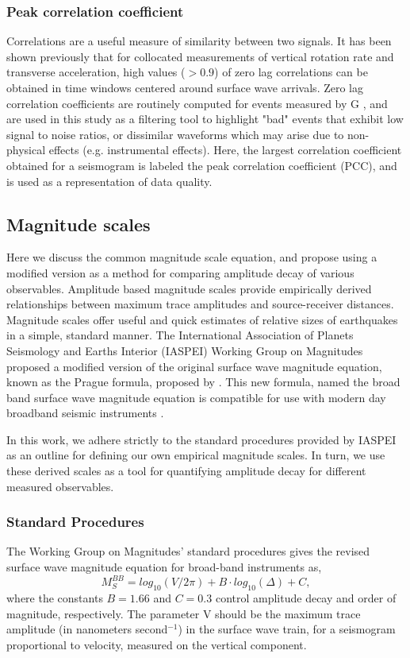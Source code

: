 \documentclass{gji}
\begin{document}
\subsubsection{Peak correlation coefficient}
Correlations are a useful measure of similarity between two signals. It has been shown previously that for collocated measurements of vertical rotation rate and transverse acceleration, high values ($>0.9$) of zero lag correlations can be obtained in time windows centered around surface wave arrivals. %
Zero lag correlation coefficients are routinely computed for events measured by G \cite{salvermoser2017event},
and are used in this study as a filtering tool to highlight "bad" events that exhibit low signal to noise ratios, or dissimilar waveforms which may arise due to non-physical effects (e.g. instrumental effects). Here, the largest correlation coefficient obtained for a seismogram is labeled the peak correlation coefficient (PCC), and is used as a representation of data quality.


\subsection{Magnitude scales}
Here we discuss the common magnitude scale equation, and propose using a modified version as a method for comparing amplitude decay of various observables. Amplitude based magnitude scales provide empirically derived relationships between maximum trace amplitudes and source-receiver distances. Magnitude scales offer useful and quick estimates of relative sizes of earthquakes in a simple, standard  manner. 
The International Association of Planets Seismology and Earths Interior (IASPEI) Working Group on Magnitudes proposed a modified version of the original surface wave magnitude equation, known as the Prague formula, proposed by \cite{karnik1962standardization}.
This new formula, named the broad band surface wave magnitude equation is compatible for use with modern day broadband seismic instruments \cite{bormann2000new}.

In this work, we adhere strictly to the standard procedures provided by IASPEI as an outline for defining our own empirical magnitude scales. In turn, we use these derived scales as a tool for quantifying amplitude decay for different measured observables.

\subsubsection{Standard Procedures}\label{standproc}
The Working Group on Magnitudes' standard procedures gives the revised surface wave magnitude equation for broad-band instruments as,
\begin{equation}\label{eq:mag}
	M_S^{BB} = log_{10}(V/2\pi) + B\cdot log_{10}(\Delta) + C, 
\end{equation}
where the constants $B=1.66$ and $C=0.3$ control amplitude decay and order of magnitude, respectively. The parameter V should be the maximum trace amplitude (in nanometers second$^{-1}$) in the surface wave train, for a seismogram proportional to velocity, measured on the vertical component. 
\end{document}

